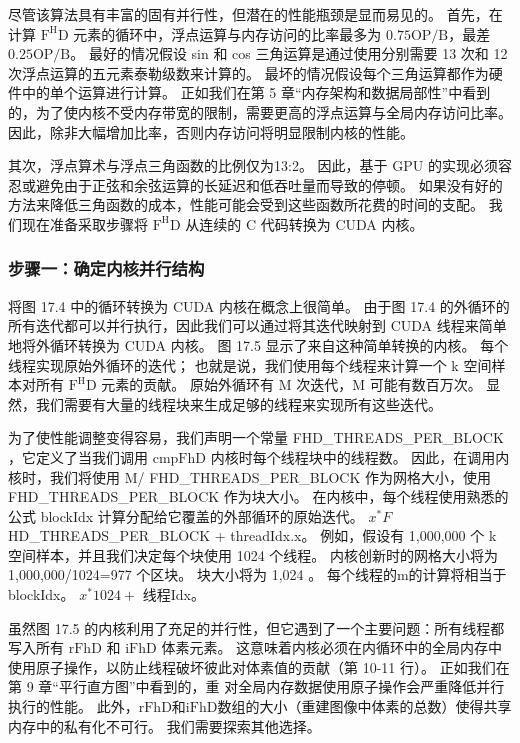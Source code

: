 尽管该算法具有丰富的固有并行性，但潜在的性能瓶颈是显而易见的。 首先，在计算 $\mathrm{F}^{\mathrm{H}} \mathrm{D}$ 元素的循环中，浮点运算与内存访问的比率最多为 $0.75 \mathrm{OP} / \mathrm{B}$，最差 $0.25 \mathrm{OP} / \mathrm{B}$。 最好的情况假设 sin 和 cos 三角运算是通过使用分别需要 13 次和 12 次浮点运算的五元素泰勒级数来计算的。 最坏的情况假设每个三角运算都作为硬件中的单个运算进行计算。 正如我们在第 5 章“内存架构和数据局部性”中看到的，为了使内核不受内存带宽的限制，需要更高的浮点运算与全局内存访问比率。 因此，除非大幅增加比率，否则内存访问将明显限制内核的性能。

其次，浮点算术与浮点三角函数的比例仅为13:2。 因此，基于 GPU 的实现必须容忍或避免由于正弦和余弦运算的长延迟和低吞吐量而导致的停顿。 如果没有好的方法来降低三角函数的成本，性能可能会受到这些函数所花费的时间的支配。 我们现在准备采取步骤将 $\mathrm{F}^{\mathrm{H}} \mathrm{D}$ 从连续的 $\mathrm{C}$ 代码转换为 CUDA 内核。

\subsubsection{步骤一：确定内核并行结构}
将图 17.4 中的循环转换为 CUDA 内核在概念上很简单。 由于图 17.4 的外循环的所有迭代都可以并行执行，因此我们可以通过将其迭代映射到 CUDA 线程来简单地将外循环转换为 CUDA 内核。 图 17.5 显示了来自这种简单转换的内核。 每个线程实现原始外循环的迭代； 也就是说，我们使用每个线程来计算一个 k 空间样本对所有 $\mathrm{F}^{\mathrm{H}} \mathrm{D}$ 元素的贡献。 原始外循环有 $\mathrm{M}$ 次迭代，$\mathrm{M}$ 可能有数百万次。 显然，我们需要有大量的线程块来生成足够的线程来实现所有这些迭代。

为了使性能调整变得容易，我们声明一个常量 FHD\_THREADS\_PER\_BLOCK ，它定义了当我们调用 $\mathrm{cmpFhD}$ 内核时每个线程块中的线程数。 因此，在调用内核时，我们将使用 M/ FHD\_THREADS\_PER\_BLOCK 作为网格大小，使用 FHD\_THREADS\_PER\_BLOCK 作为块大小。 在内核中，每个线程使用熟悉的公式 blockIdx 计算分配给它覆盖的外部循环的原始迭代。 $x^{*} F$ HD\_THREADS\_PER\_BLOCK + threadIdx.x。 例如，假设有 1,000,000 个 k 空间样本，并且我们决定每个块使用 1024 个线程。 内核创新时的网格大小将为 1,000,000/1024=977 个区块。 块大小将为 1,024 。 每个线程的$\mathrm{m}$的计算将相当于blockIdx。 $x^{*} 1024+$ 线程Idx。

虽然图 17.5 的内核利用了充足的并行性，但它遇到了一个主要问题：所有线程都写入所有 $\mathrm{rFhD}$ 和 $\mathrm{iFhD}$ 体素元素。 这意味着内核必须在内循环中的全局内存中使用原子操作，以防止线程破坏彼此对体素值的贡献（第 10-11 行）。 正如我们在第 9 章“平行直方图”中看到的，重
对全局内存数据使用原子操作会严重降低并行执行的性能。 此外，$\mathrm{rFhD}$和$\mathrm{iFhD}$数组的大小（重建图像中体素的总数）使得共享内存中的私有化不可行。 我们需要探索其他选择。

